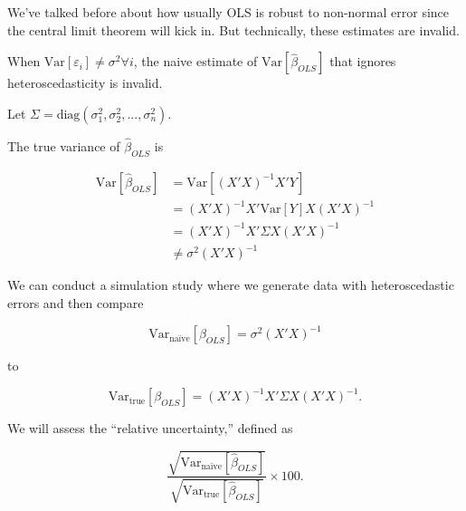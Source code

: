 \documentclass[
  letterpaper,
  DIV=11,
  numbers=noendperiod]{scrreport}
\begin{document}
We've talked before about how usually OLS is robust to non-normal error
since the central limit theorem will kick in. But technically, these
estimates are invalid.

When \(\text{Var}[\varepsilon_i] \neq \sigma^2 \forall i\), the naive
estimate of \(\text{Var}[\hat \beta_{OLS}]\) that ignores
heteroscedasticity is invalid.

Let \(\Sigma = \text{diag}(\sigma_1^2, \sigma_2^2, ..., \sigma_n^2)\).

The true variance of \(\hat \beta_{OLS}\) is

\[
\begin{aligned}
\text{Var}[\hat \beta_{OLS}] & = \text{Var}[(X'X)^{-1} X'Y] \\ 
& = (X'X)^{-1}X' \text{Var}[Y] X(X'X)^{-1} \\ 
& = (X'X)^{-1}X' \Sigma X (X'X)^{-1} \\ 
& \neq \sigma^2 (X'X)^{-1}
\end{aligned}
\]

We can conduct a simulation study where we generate data with
heteroscedastic errors and then compare

\[\text{Var}_{\text{naïve}}[\beta_{OLS}] = \sigma^2 (X'X)^{-1}
\]

to

\[\text{Var}_{\text{true}} [\beta_{OLS}] = (X'X)^{-1} X' \Sigma X (X'X)^{-1}.
\]

We will assess the ``relative uncertainty,'' defined as

\[
\frac{\sqrt{\text{Var}_{\text{naïve}}[\hat \beta_{OLS}]}}
{\sqrt{\text{Var}_{\text{true}}[\hat \beta_{OLS}]}} 
\times 100.
\]
\end{document}
